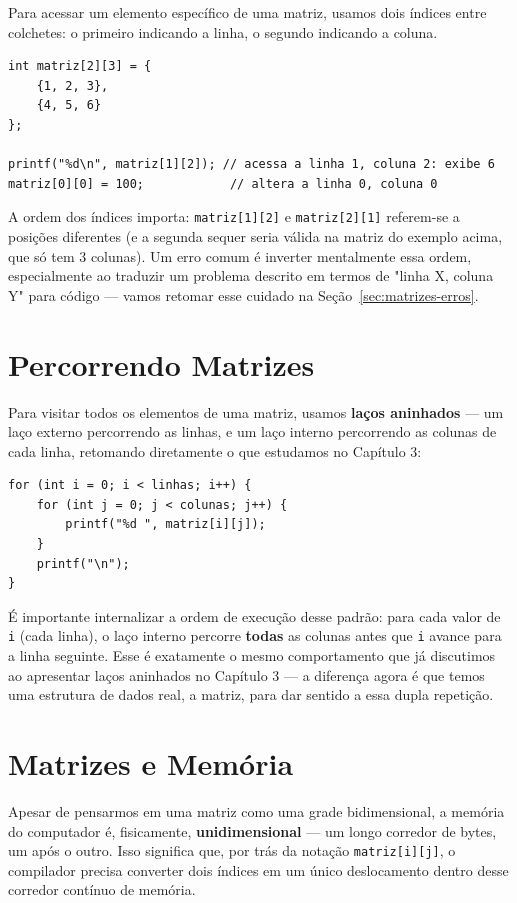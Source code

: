 Para acessar um elemento específico de uma matriz, usamos dois índices entre colchetes: o primeiro indicando a linha, o segundo indicando a coluna.

\begin{lstlisting}
int matriz[2][3] = {
    {1, 2, 3},
    {4, 5, 6}
};

printf("%d\n", matriz[1][2]); // acessa a linha 1, coluna 2: exibe 6
matriz[0][0] = 100;            // altera a linha 0, coluna 0
\end{lstlisting}

A ordem dos índices importa: \texttt{matriz[1][2]} e \texttt{matriz[2][1]} referem-se a posições diferentes (e a segunda sequer seria válida na matriz do exemplo acima, que só tem 3 colunas). Um erro comum é inverter mentalmente essa ordem, especialmente ao traduzir um problema descrito em termos de "linha X, coluna Y" para código — vamos retomar esse cuidado na Seção~\ref{sec:matrizes-erros}.

\section{Percorrendo Matrizes}
\label{sec:matrizes-percorrendo}

Para visitar todos os elementos de uma matriz, usamos \textbf{laços aninhados} — um laço externo percorrendo as linhas, e um laço interno percorrendo as colunas de cada linha, retomando diretamente o que estudamos no Capítulo 3:

\begin{lstlisting}
for (int i = 0; i < linhas; i++) {
    for (int j = 0; j < colunas; j++) {
        printf("%d ", matriz[i][j]);
    }
    printf("\n");
}
\end{lstlisting}

É importante internalizar a ordem de execução desse padrão: para cada valor de \texttt{i} (cada linha), o laço interno percorre \textbf{todas} as colunas antes que \texttt{i} avance para a linha seguinte. Esse é exatamente o mesmo comportamento que já discutimos ao apresentar laços aninhados no Capítulo 3 — a diferença agora é que temos uma estrutura de dados real, a matriz, para dar sentido a essa dupla repetição.

\section{Matrizes e Memória}
\label{sec:matrizes-memoria}

Apesar de pensarmos em uma matriz como uma grade bidimensional, a memória do computador é, fisicamente, \textbf{unidimensional} — um longo corredor de bytes, um após o outro. Isso significa que, por trás da notação \texttt{matriz[i][j]}, o compilador precisa converter dois índices em um único deslocamento dentro desse corredor contínuo de memória.

